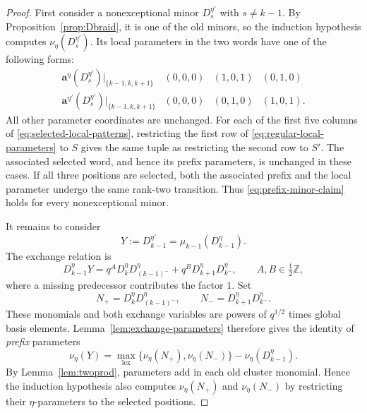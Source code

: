 \documentclass[12pt, reqno]{amsart}
\theoremstyle{plain}
\theoremstyle{definition}
\numberwithin{equation}{section}
\begin{document}
\begin{proof}
First consider a nonexceptional minor $D_s^{\eta'}$ with $s\ne k-1$.
By Proposition~\ref{prop:Dbraid}, it is one of the old minors, so the
induction hypothesis computes $\nu_\eta(D_s^{\eta'})$. Its local
parameters in the two words have one of the following forms:
\begin{equation}\label{eq:regular-local-parameters}
\begin{array}{c|ccc}
 \mathbf a^\eta(D_s^{\eta'})|_{\{k-1,k,k+1\}}
     &(0,0,0)&(1,0,1)&(0,1,0)\\
 \hline
 \mathbf a^{\eta'}(D_s^{\eta'})|_{\{k-1,k,k+1\}}
     &(0,0,0)&(0,1,0)&(1,0,1).
\end{array}
\end{equation}
All other parameter coordinates are unchanged. For each of the first
five columns of \eqref{eq:selected-local-patterns}, restricting the
first row of \eqref{eq:regular-local-parameters} to $S$ gives the same
tuple as restricting the second row to $S'$. The associated selected
word, and hence its prefix parameters, is unchanged in these cases.
If all three positions are selected, both the associated prefix and
the local parameter undergo the same rank-two transition. Thus
\eqref{eq:prefix-minor-claim} holds for every nonexceptional minor.

It remains to consider
\[
    Y:=D_{k-1}^{\eta'}=\mu_{k-1}(D_{k-1}^{\eta}).
\]
The exchange relation is
\begin{equation}\label{eq:exchangeD}
    D_{k-1}^{\eta}Y
    =q^A D_k^\eta D_{(k-1)^-}^\eta
      +q^B D_{k+1}^\eta D_{k^-}^\eta,
    \qquad A,B\in\tfrac12\mathbb Z,
\end{equation}
where a missing predecessor contributes the factor $1$. Set
\[
    N_+=D_k^\eta D_{(k-1)^-}^\eta,\qquad
    N_-=D_{k+1}^\eta D_{k^-}^\eta.
\]
These monomials and both exchange variables are powers of $q^{1/2}$
times global basis elements. Lemma~\ref{lem:exchange-parameters}
therefore gives the identity of \emph{prefix} parameters
\begin{equation}\label{eq:k-1inpi}
    \nu_\eta(Y)
    =\max_{\mathrm{lex}}\{\nu_\eta(N_+),\nu_\eta(N_-)\}
       -\nu_\eta(D_{k-1}^{\eta}).
\end{equation}
By Lemma~\ref{lem:twoprod}, parameters add in each old cluster
monomial. Hence the induction hypothesis also computes
$\nu_\eta(N_+)$ and $\nu_\eta(N_-)$ by restricting their
$\eta$-parameters to the selected positions.


\end{proof}
\end{document}
